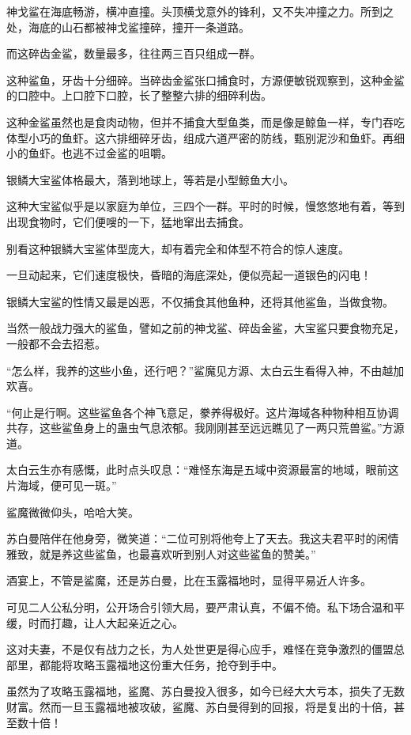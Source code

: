 \begin{this_body}
神戈鲨在海底畅游，横冲直撞。头顶横戈意外的锋利，又不失冲撞之力。所到之处，海底的山石都被神戈鲨撞碎，撞开一条道路。

而这碎齿金鲨，数量最多，往往两三百只组成一群。

这种鲨鱼，牙齿十分细碎。当碎齿金鲨张口捕食时，方源便敏锐观察到，这种金鲨的口腔中。上口腔下口腔，长了整整六排的细碎利齿。

这种金鲨虽然也是食肉动物，但并不捕食大型鱼类，而是像是鲸鱼一样，专门吞吃体型小巧的鱼虾。这六排细碎牙齿，组成六道严密的防线，甄别泥沙和鱼虾。再细小的鱼虾。也逃不过金鲨的咀嚼。

银鳞大宝鲨体格最大，落到地球上，等若是小型鲸鱼大小。

这种大宝鲨似乎是以家庭为单位，三四个一群。平时的时候，慢悠悠地有着，等到出现食物时，它们便嗖的一下，猛地窜出去捕食。

别看这种银鳞大宝鲨体型庞大，却有着完全和体型不符合的惊人速度。

一旦动起来，它们速度极快，昏暗的海底深处，便似亮起一道银色的闪电！

银鳞大宝鲨的性情又最是凶恶，不仅捕食其他鱼种，还将其他鲨鱼，当做食物。

当然一般战力强大的鲨鱼，譬如之前的神戈鲨、碎齿金鲨，大宝鲨只要食物充足，一般都不会去招惹。

“怎么样，我养的这些小鱼，还行吧？”鲨魔见方源、太白云生看得入神，不由越加欢喜。

“何止是行啊。这些鲨鱼各个神飞意足，豢养得极好。这片海域各种物种相互协调共存，这些鲨鱼身上的蛊虫气息浓郁。我刚刚甚至远远瞧见了一两只荒兽鲨。”方源道。

太白云生亦有感慨，此时点头叹息：“难怪东海是五域中资源最富的地域，眼前这片海域，便可见一斑。”

鲨魔微微仰头，哈哈大笑。

苏白曼陪伴在他身旁，微笑道：“二位可别将他夸上了天去。我这夫君平时的闲情雅致，就是养这些鲨鱼，也最喜欢听到别人对这些鲨鱼的赞美。”

酒宴上，不管是鲨魔，还是苏白曼，比在玉露福地时，显得平易近人许多。

可见二人公私分明，公开场合引领大局，要严肃认真，不偏不倚。私下场合温和平缓，时而打趣，让人大起亲近之心。

这对夫妻，不是仅有战力之长，为人处世更是得心应手，难怪在竞争激烈的僵盟总部里，都能将攻略玉露福地这份重大任务，抢夺到手中。

虽然为了攻略玉露福地，鲨魔、苏白曼投入很多，如今已经大大亏本，损失了无数财富。然而一旦玉露福地被攻破，鲨魔、苏白曼得到的回报，将是复出的十倍，甚至数十倍！


\end{this_body}
